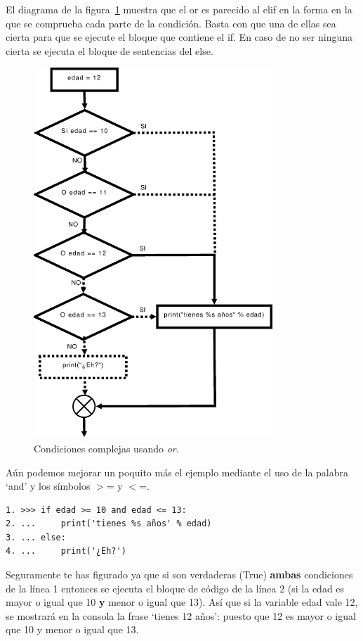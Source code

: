 El diagrama de la figura~\ref{if8} muestra que el or es parecido al elif en la forma en la que se comprueba cada parte de la condición. Basta con que una de ellas sea cierta para que se ejecute el bloque que contiene el if. En caso de no ser ninguna cierta se ejecuta el bloque de sentencias del else.

\begin{figure}
\begin{center}
\includegraphics[width=90mm]{if8.eps}
\end{center}
\caption{Condiciones complejas usando \emph{or}.}\label{if8}
\end{figure}

Aún podemos mejorar un poquito más el ejemplo mediante el uso de la palabra `and' y los símbolos $>$= y $<$=.

\begin{listing}
\begin{verbatim}
1. >>> if edad >= 10 and edad <= 13:
2. ...     print('tienes %s años' % edad)
3. ... else:
4. ...     print('¿Eh?')
\end{verbatim}
\end{listing}

Seguramente te has figurado ya que si son verdaderas (True) \textbf{ambas} condiciones de la línea 1 entonces se ejecuta el bloque de código de la línea 2 (si la edad es mayor o igual que 10 \textbf{y} menor o igual que 13). Así que si la variable edad vale 12, se mostrará en la consola la frase `tienes 12 años': puesto que 12 es mayor o igual que 10 y menor o igual que 13.  

